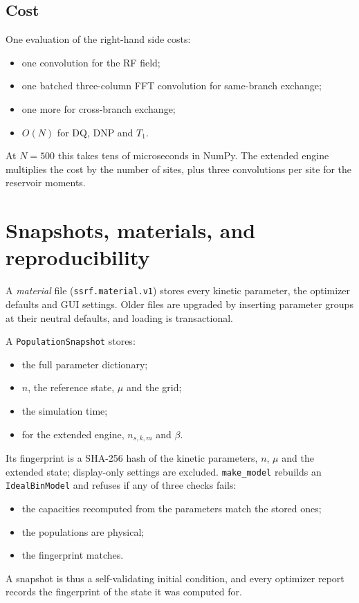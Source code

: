 \documentclass[11pt]{article}
\newcommand{\code}[1]{\texttt{#1}}
\begin{document}
\subsection{Cost}

One evaluation of the right-hand side costs:
\begin{itemize}
\item one convolution for the RF field;
\item one batched three-column FFT convolution for same-branch exchange;
\item one more for cross-branch exchange;
\item \(O(N)\) for DQ, DNP and \(T_1\).
\end{itemize}
At \(N=500\) this takes tens of microseconds in NumPy. The extended engine multiplies the cost by
the number of sites, plus three convolutions per site for the reservoir moments.

\section{Snapshots, materials, and reproducibility}
\label{sec:snapshots}

A \emph{material} file (\code{ssrf.material.v1}) stores every kinetic parameter, the optimizer
defaults and GUI settings. Older files are upgraded by inserting parameter groups at their neutral
defaults, and loading is transactional.

A \code{PopulationSnapshot} stores:
\begin{itemize}
\item the full parameter dictionary;
\item \(n\), the reference state, \(\mu\) and the grid;
\item the simulation time;
\item for the extended engine, \(n_{s,k,m}\) and \(\beta\).
\end{itemize}
Its fingerprint is a SHA-256 hash of the kinetic parameters, \(n\), \(\mu\) and the extended
state; display-only settings are excluded. \code{make\_model} rebuilds an \code{IdealBinModel}
and refuses if any of three checks fails:
\begin{itemize}
\item the capacities recomputed from the parameters match the stored ones;
\item the populations are physical;
\item the fingerprint matches.
\end{itemize}
A snapshot is thus a self-validating initial condition, and every optimizer report records the
fingerprint of the state it was computed for.
\end{document}
